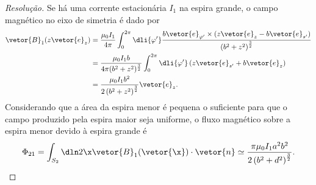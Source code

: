 \begin{proof}[Resolução]
    Se há uma corrente estacionária \(I_1\) na espira grande, o campo magnético no eixo de simetria é dado por
    \begin{align*}
        \vetor{B}_1(z\vetor{e}_z) &= \frac{\mu_0 I_1}{4\pi} \int_{0}^{2\pi} \dli{\varphi'}\frac{b\vetor{e}_{\varphi'}\times \left(z\vetor{e}_z - b\vetor{e}_{s'}\right)}{\left(b^2 + z^2\right)^{\frac32}}\\
                                  &= \frac{\mu_0 I_1 b}{4\pi( b^2 + z^2)^{\frac32}} \int_0^{2\pi} \dli{\varphi'} \left(z \vetor{e}_{s'} + b \vetor{e}_z\right)\\
                                  &= \frac{\mu_0 I_1 b^2}{2\left(b^2 + z^2\right)^{\frac32}} \vetor{e}_z.
    \end{align*}
    Considerando que a área da espira menor é pequena o suficiente para que o campo produzido pela espira maior seja uniforme, o fluxo magnético sobre a espira menor devido à espira grande é
    \begin{equation*}
        \Phi_{21} = \int_{S_2} \dln2\x \vetor{B}_1(\vetor{\x}) \cdot \vetor{n} \simeq \frac{\pi \mu_0 I_1 a^2 b^2}{2\left(b^2 + d^2\right)^{\frac32}}.
    \end{equation*}


\end{proof}
